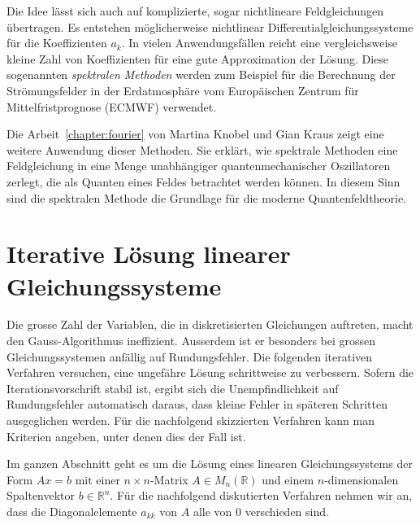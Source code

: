 Die Idee lässt sich auch auf komplizierte, sogar nichtlineare
Feldgleichungen übertragen.
Es entstehen möglicherweise nichtlinear Differentialgleichungssysteme
für die Koeffizienten $a_k$.
In vielen Anwendungsfällen reicht eine vergleichsweise kleine Zahl
von Koeffizienten für eine gute Approximation der Lösung.
Diese sogenannten \emph{spektralen Methoden}
%
werden zum Beispiel für die Berechnung der Strömungsfelder in der 
Erdatmosphäre vom Europäischen Zentrum für Mittelfristprognose
(ECMWF) verwendet.

Die Arbeit~\ref{chapter:fourier} von Martina Knobel und Gian Kraus
zeigt eine weitere Anwendung dieser Methoden.
Sie erklärt, wie spektrale Methoden eine Feldgleichung in eine Menge
unabhängiger quantenmechanischer Oszillatoren zerlegt, die als Quanten
eines Feldes betrachtet werden können.
In diesem Sinn sind die spektralen Methode die Grundlage für die
moderne Quantenfeldtheorie.

%
%
\section{Iterative Lösung linearer Gleichungssysteme
\label{buch:pdenumerik:section:linear}}
Die grosse Zahl der Variablen, die in diskretisierten Gleichungen auftreten,
macht den Gauss-Algorithmus ineffizient.
Ausserdem ist er besonders bei grossen Gleichungssystemen anfällig auf
Rundungsfehler.
Die folgenden iterativen Verfahren versuchen, eine ungefähre Lösung
schrittweise zu verbessern.
Sofern die Iterationsvorschrift stabil ist, ergibt sich die Unempfindlichkeit
auf Rundungsfehler automatisch daraus, dass kleine Fehler in späteren
Schritten ausgeglichen werden.
Für die nachfolgend skizzierten Verfahren kann man Kriterien angeben,
unter denen dies der Fall ist.

Im ganzen Abschnitt geht es um die Lösung eines linearen Gleichungssystems
der Form $Ax=b$ mit einer $n\times n$-Matrix $A\in M_n(\mathbb{R})$ und
einem $n$-dimensionalen Spaltenvektor $b\in\mathbb{R}^n$.
Für die nachfolgend diskutierten Verfahren nehmen wir an, dass die
Diagonalelemente $a_{kk}$ von $A$ alle von $0$ verschieden sind.

%
%
